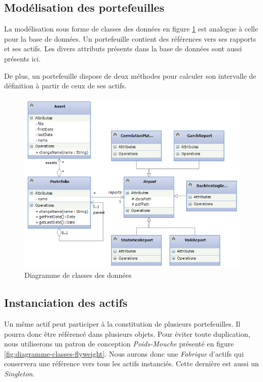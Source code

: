 \documentclass[a4paper,titlepage,french]{report}
\begin{document}
\subsection{Modélisation des portefeuilles}

La modélisation sous forme de classes des données en figure \ref{fig:diagramme-classes-donnees} est analogue à celle pour la base de données. Un portefeuille contient des références vers ses rapports et ses actifs. Les divers attributs présents dans la base de données sont aussi présents ici.

De plus, un portefeuille dispose de deux méthodes pour calculer son intervalle de définition à partir de ceux de ses actifs.

\begin{figure}
  	\center
  	\includegraphics[width=1\textwidth]{diagramme-classes-donnees.png}
  	\caption{Diagramme de classes des données}
  	\label{fig:diagramme-classes-donnees}
\end{figure}


\subsection{Instanciation des actifs}

Un même actif peut participer à la constitution de plusieurs portefeuilles.
Il pourra donc être référencé dans plusieurs objets.
Pour éviter toute duplication, nous utiliserons un patron de conception \textit{Poids-Mouche} présenté en figure \ref{fig:diagramme-classes-flyweight}.
Nous aurons donc une \textit{Fabrique} d'actifs qui conservera une référence vers tous les actifs instanciés. Cette dernière est aussi un \textit{Singleton}.
\end{document}
